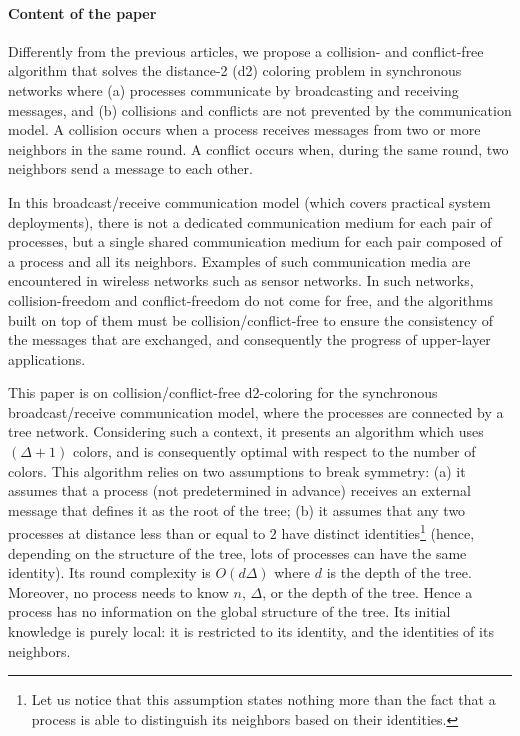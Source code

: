 \documentclass[11pt,english]{article}
\begin{document}
\paragraph{Content of the paper}
Differently from the previous articles, we propose a collision- and
conflict-free algorithm that solves the distance-2 (d2) coloring problem in
synchronous networks where (a) processes communicate by broadcasting
and receiving messages, and (b) collisions and conflicts are not
prevented by the communication model.  A collision occurs when a
process receives messages from two or more neighbors in the same
round. A conflict occurs when, during the same round, two neighbors
send a message to each other.

In this broadcast/receive communication model (which covers practical
system deployments), there is not a dedicated communication medium for
each pair of processes, but a single shared communication medium for
each pair composed of a process and all its neighbors.  Examples of
such communication media are encountered in wireless networks such as
sensor networks. In such networks, collision-freedom and
conflict-freedom do not come for free, and the algorithms built on top
of them must be collision/conflict-free to ensure the consistency of
the messages that are exchanged, and consequently the progress of
upper-layer applications.

This paper is on collision/conflict-free d2-coloring for the
synchronous broadcast/receive communication model, where the processes
are connected by a tree network.  Considering such a context, it
presents an algorithm which uses $(\Delta+1)$ colors, and is
consequently optimal with respect to the number of colors. This
algorithm relies on two assumptions to break symmetry: (a) it assumes
that a process (not predetermined in advance) receives an external
message that defines it as the root of the tree; (b) it assumes that
any two processes at distance less than or equal to $2$ have distinct identities\footnote{Let us notice
  that this assumption states nothing more than the fact that a
  process is able to distinguish its neighbors based on their
  identities.} (hence, depending on the structure of the tree, lots of
processes can have the same identity). Its round complexity is
$O(d\Delta)$ where $d$ is the depth of the tree. Moreover, no process
needs to know $n$, $\Delta$, or the depth of the tree. Hence a process
has no information on the global structure of the tree.  Its initial
knowledge is purely local: it is restricted to its identity, and the
identities of its neighbors.
\end{document}
